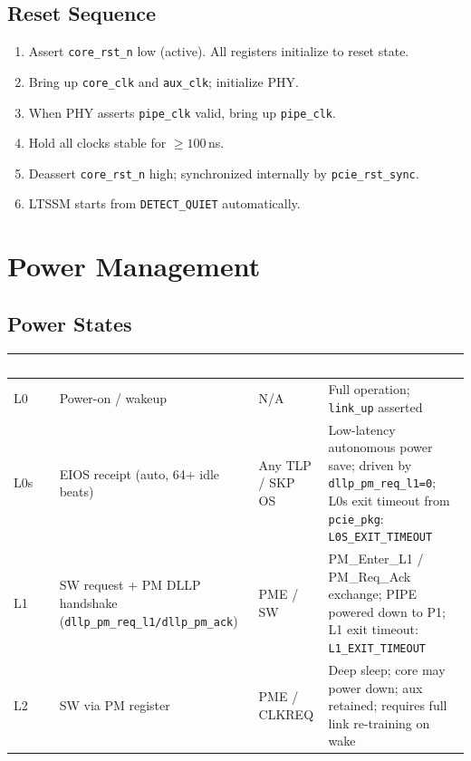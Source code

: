 \documentclass[11pt,a4paper]{article}
\newcommand{\theadcell}[1]{%
  \cellcolor{tablehead}\textcolor{white}{\textbf{#1}}}
\begin{document}
\subsection{Reset Sequence}

\begin{enumerate}[noitemsep]
  \item Assert \texttt{core\_rst\_n} low (active). All registers initialize to reset state.
  \item Bring up \texttt{core\_clk} and \texttt{aux\_clk}; initialize PHY.
  \item When PHY asserts \texttt{pipe\_clk} valid, bring up \texttt{pipe\_clk}.
  \item Hold all clocks stable for $\geq 100$\,ns.
  \item Deassert \texttt{core\_rst\_n} high; synchronized internally by \texttt{pcie\_rst\_sync}.
  \item LTSSM starts from \texttt{DETECT\_QUIET} automatically.
\end{enumerate}

\section{Power Management}

\subsection{Power States}

\begin{tabular}{p{2cm}p{3.5cm}p{2.5cm}p{6cm}}
  \toprule
  \theadcell{State} & \theadcell{Entry} & \theadcell{Exit} & \theadcell{Description} \\
  \midrule
  L0   & Power-on / wakeup & N/A    & Full operation; \texttt{link\_up} asserted \\
  L0s  & EIOS receipt (auto, 64+ idle beats) & Any TLP / SKP OS & Low-latency autonomous power save; driven by \texttt{dllp\_pm\_req\_l1=0}; L0s exit timeout from \texttt{pcie\_pkg}: \texttt{L0S\_EXIT\_TIMEOUT} \\
  L1   & SW request + PM DLLP handshake (\texttt{dllp\_pm\_req\_l1/dllp\_pm\_ack}) & PME / SW & PM\_Enter\_L1 / PM\_Req\_Ack exchange; PIPE powered down to P1; L1 exit timeout: \texttt{L1\_EXIT\_TIMEOUT} \\
  L2   & SW via PM register & PME / CLKREQ & Deep sleep; core may power down; aux retained; requires full link re-training on wake \\
  \bottomrule
\end{tabular}
\end{document}
